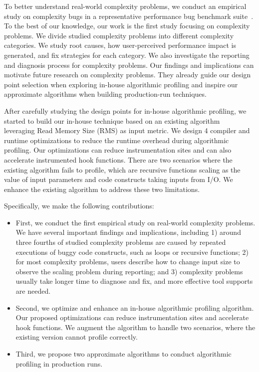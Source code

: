 To better understand real-world complexity problems,
we conduct an empirical study on complexity bugs 
in a representative performance bug benchmark suite~\cite{PerfBug,SongOOPSLA2014}.
To the best of our knowledge, our work is the first study focusing on complexity problems.
We divide studied complexity problems into different complexity categories.    
We study root causes, how user-perceived performance impact is generated, 
and fix strategies for each category.
We also investigate the reporting and diagnosis process for complexity problems. 
Our findings and implications can motivate future research on complexity problems. 
They already guide our design point selection when exploring in-house algorithmic profiling 
and inspire our approximate algorithms when building production-run techniques. 

After carefully studying the design points for in-house algorithmic profiling,
we started to build our in-house technique 
based on an existing algorithm~\cite{Aprof1,Aprof2} leveraging 
Read Memory Size (RMS) as input metric. 
We design 4 compiler and runtime optimizations 
to reduce the runtime overhead during algorithmic profiling.
Our optimizations can reduce instrumentation sites 
and can also accelerate instrumented hook functions. 
There are two scenarios where the existing algorithm fails to profile, 
which are recursive functions scaling as the value of input parameters 
and code constructs taking inputs from I/O.
We enhance the existing algorithm to address these two limitations. 




Specifically, we make the following contributions:

\begin{itemize}

\item First, we conduct the first empirical study on real-world complexity problems. 
We have several important findings and implications, including
1) around three fourths of studied complexity problems are 
caused by repeated executions of buggy code constructs,
such as loops or recursive functions;
2) for most complexity problems, 
users describe how to change input size to observe the scaling problem during reporting;
and 3) complexity problems usually take longer time to diagnose and fix, 
and more effective tool supports are needed.  

\item Second, we optimize and enhance an in-house algorithmic profiling algorithm.
Our proposed optimizations 
can reduce instrumentation sites and accelerate hook functions.
We augment the algorithm to handle two scenarios, 
where the existing version cannot profile correctly. 





\item Third, we propose two approximate algorithms to conduct algorithmic profiling in production runs. 

\end{itemize}

